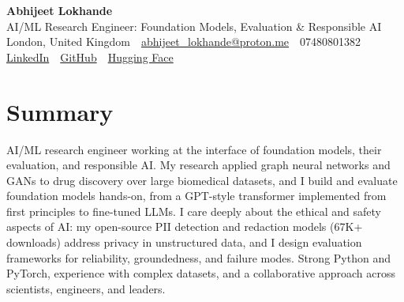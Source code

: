 \documentclass[10pt,a4paper]{article}
\newcommand{\sep}{\,\textcolor{accent!60}{\textbar}\,}
\begin{document}
\begin{center}
  {\fontsize{24}{26}\selectfont\bfseries Abhijeet Lokhande}\\[3pt]
  {\color{accent}\large AI/ML Research Engineer: Foundation Models, Evaluation \& Responsible AI}\\[5pt]
  {\small
    London, United Kingdom \sep
    \href{mailto:abhijeet_lokhande@proton.me}{abhijeet\_lokhande@proton.me} \sep
    07480801382 \\[2pt]
    \href{https://www.linkedin.com/in/ablds/}{LinkedIn} \sep
    \href{https://github.com/abhijeetscode}{GitHub} \sep
    \href{https://huggingface.co/ab-ai}{Hugging Face}
  }
\end{center}
\vspace{2pt}

\section{Summary}
AI/ML research engineer working at the interface of foundation models, their evaluation, and responsible AI. My research applied graph neural networks and GANs to drug discovery over large biomedical datasets, and I build and evaluate foundation models hands-on, from a GPT-style transformer implemented from first principles to fine-tuned LLMs. I care deeply about the ethical and safety aspects of AI: my open-source PII detection and redaction models (67K+ downloads) address privacy in unstructured data, and I design evaluation frameworks for reliability, groundedness, and failure modes. Strong Python and PyTorch, experience with complex datasets, and a collaborative approach across scientists, engineers, and leaders.

\end{document}
